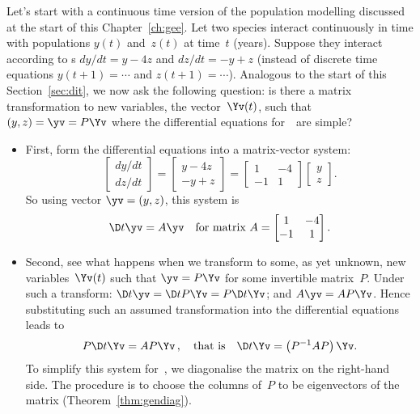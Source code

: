 Let's start with a continuous time version of the population modelling discussed at the start of this Chapter~\ref{ch:gee}.
Let two species interact continuously in time with populations \(y(t)\) and~\(z(t)\) at time~\(t\) (years).
Suppose they interact according to s \(dy/dt=y-4z\) and \(dz/dt=-y+z\) (instead of discrete time equations \(y(t+1)=\cdots\) and \(z(t+1)=\cdots\)).
Analogous to the start of this Section~\ref{sec:dit}, we now ask the following question: is there a matrix transformation to new variables, the vector~\(\Yv(t)\), such that \((y,z)=\yv=P\Yv\) where the differential equations for~\Yv\ are simple?
\begin{itemize}
\item First, form the differential equations into a matrix-vector system:
\begin{equation*}
\begin{bmatrix} dy/dt\\dz/dt \end{bmatrix}
=\begin{bmatrix} y-4z
\\ -y+z \end{bmatrix}
=\begin{bmatrix} 1&-4\\-1& 1 \end{bmatrix}\begin{bmatrix} y\\z \end{bmatrix}.
\end{equation*}
So using vector \(\yv=(y,z)\), this system is
\begin{equation*}
\D t\yv=A\yv
\quad\text{for matrix }A=\begin{bmatrix} 1&-4\\-1& 1 \end{bmatrix}.
\end{equation*}

\item Second, see what happens when we transform to some, as yet unknown, new variables~\(\Yv(t)\) such that \(\yv=P\Yv\) for some invertible matrix~\(P\).
Under such a transform: \(\D t\yv=\D t{}P\Yv=P\D t\Yv\); and \(A\yv=AP\Yv\).
Hence substituting such an assumed transformation into the differential equations leads to
\begin{equation*}
P\D t\Yv=AP\Yv\,, 
\quad\text{that is}\quad
\D t\Yv=\left(P^{-1}AP\right)\Yv.
\end{equation*}
To simplify this system for~\Yv, we diagonalise the matrix on the right-hand side.
The procedure is to choose the columns of~\(P\) to be eigenvectors of the matrix (Theorem~\ref{thm:gendiag}).


\end{itemize}
